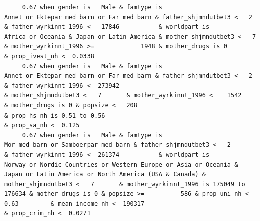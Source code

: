\documentclass[
  letterpaper,
  DIV=11,
  numbers=noendperiod]{scrreprt}
\begin{document}
\begin{verbatim}
     0.67 when gender is   Male & famtype is                        Annet or Ektepar med barn or Far med barn & father_shjmndutbet3 <   2       & father_wyrkinnt_1996 <   17846           & worldpart is                                                                                          Africa or Oceania & Japan or Latin America & mother_shjmndutbet3 <   7       & mother_wyrkinnt_1996 >=             1948 & mother_drugs is 0                                                                                                                                                              & prop_ivest_nh <  0.0338                                                                                                                                                                                                                                                  
     0.67 when gender is   Male & famtype is                        Annet or Ektepar med barn or Far med barn & father_shjmndutbet3 <   2       & father_wyrkinnt_1996 <  273942                                                                                                                                                              & mother_shjmndutbet3 <   7       & mother_wyrkinnt_1996 <    1542           & mother_drugs is 0 & popsize <   208                                                                            & prop_hs_nh is 0.51 to 0.56                                                                                                                                           & prop_sa_nh <  0.125                                                                                                                                               
     0.67 when gender is   Male & famtype is                              Mor med barn or Samboerpar med barn & father_shjmndutbet3 <   2       & father_wyrkinnt_1996 <  261374           & worldpart is            Norway or Nordic Countries or Western Europe or Asia or Oceania & Japan or Latin America or North America (USA & Canada) & mother_shjmndutbet3 <   7       & mother_wyrkinnt_1996 is 175049 to 176634 & mother_drugs is 0 & popsize >=          586 & prop_uni_nh <  0.63         & mean_income_nh <  190317                                        & prop_crim_nh <  0.0271                                                                                                                                                                                                                                                                                      

\end{verbatim}
\end{document}
